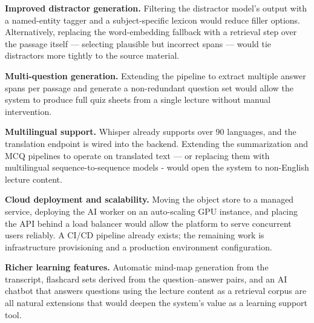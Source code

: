 \textbf{Improved distractor generation.} Filtering the distractor model's output with a named-entity tagger and a subject-specific lexicon would reduce filler options. Alternatively, replacing the word-embedding fallback with a retrieval step over the passage itself — selecting plausible but incorrect spans — would tie distractors more tightly to the source material.

\textbf{Multi-question generation.} Extending the pipeline to extract multiple answer spans per passage and generate a non-redundant question set would allow the system to produce full quiz sheets from a single lecture without manual intervention.

\textbf{Multilingual support.} Whisper already supports over 90 languages, and the translation endpoint is wired into the backend. Extending the summarization and MCQ pipelines to operate on translated text — or replacing them with multilingual sequence-to-sequence models - would open the system to non-English lecture content.

\textbf{Cloud deployment and scalability.} Moving the object store to a managed service, deploying the AI worker on an auto-scaling GPU instance, and placing the API behind a load balancer would allow the platform to serve concurrent users reliably. A CI/CD pipeline already exists; the remaining work is infrastructure provisioning and a production environment configuration.

\textbf{Richer learning features.} Automatic mind-map generation from the transcript, flashcard sets derived from the question–answer pairs, and an AI chatbot that answers questions using the lecture content as a retrieval corpus are all natural extensions that would deepen the system's value as a learning support tool.